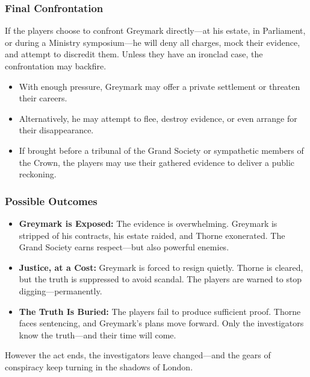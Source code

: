 \subsubsection*{Final Confrontation}
If the players choose to confront Greymark directly—at his estate, in Parliament, or during a Ministry symposium—he will deny all charges, mock their evidence, and attempt to discredit them. Unless they have an ironclad case, the confrontation may backfire.

\begin{itemize}
    \item With enough pressure, Greymark may offer a private settlement or threaten their careers.
    \item Alternatively, he may attempt to flee, destroy evidence, or even arrange for their disappearance.
    \item If brought before a tribunal of the Grand Society or sympathetic members of the Crown, the players may use their gathered evidence to deliver a public reckoning.
\end{itemize}

\newcolumn
\subsubsection*{Possible Outcomes}

\begin{itemize}
    \item \textbf{Greymark is Exposed:} The evidence is overwhelming. Greymark is stripped of his contracts, his estate raided, and Thorne exonerated. The Grand Society earns respect—but also powerful enemies.
    
    \item \textbf{Justice, at a Cost:} Greymark is forced to resign quietly. Thorne is cleared, but the truth is suppressed to avoid scandal. The players are warned to stop digging—permanently.
    
    \item \textbf{The Truth Is Buried:} The players fail to produce sufficient proof. Thorne faces sentencing, and Greymark’s plans move forward. Only the investigators know the truth—and their time will come.
\end{itemize}

However the act ends, the investigators leave changed—and the gears of conspiracy keep turning in the shadows of London.

